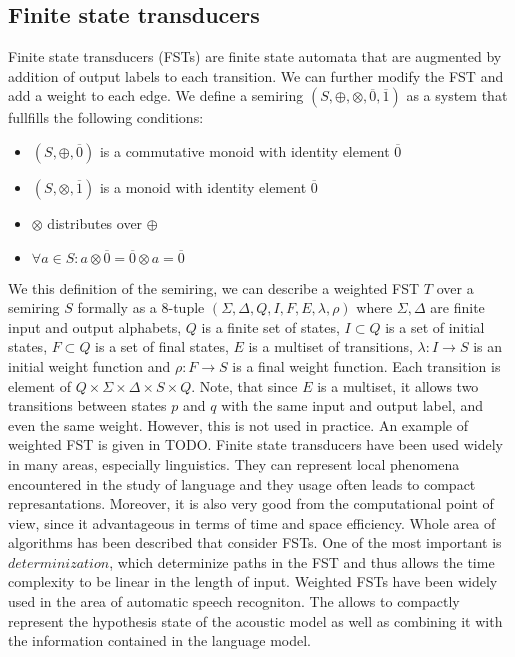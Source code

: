 \subsection{Finite state transducers\cite{mohri1997finite}}
\label{fst-desc}
Finite state transducers (FSTs) are finite state automata that are augmented by addition of output labels to each transition.
We can further modify the FST and add a weight to each edge.
We define a semiring $(S,\oplus,\otimes,\overline{0},\overline{1})$ as a system that fullfills the following conditions:
\begin{itemize}
\item $(S,\oplus,\overline{0})$ is a commutative monoid with identity element $\overline{0}$
\item $(S,\otimes,\overline{1})$ is a monoid with identity element $\overline{0}$
\item $\otimes $ distributes over $\oplus$
\item $\forall a \in S: a \otimes \overline{0} = \overline{0} \otimes a = \overline{0}$
\end{itemize}
We this definition of the semiring, we can describe a weighted FST\cite{mohri2009weighted} $T$ over a semiring $S$ formally as a 8-tuple $(\Sigma,\Delta,Q,I,F,E,\lambda,\rho)$ where $\Sigma, \Delta$ are finite input and output alphabets, $Q$ is a finite set of states, $I \subset Q$ is a set of initial states, $F \subset Q$ is a set of final states, $E$ is a multiset of transitions, $\lambda: I \rightarrow S$ is an initial weight function and $\rho: F \rightarrow S$ is a final weight function.
Each transition is element of $Q \times \Sigma \times \Delta \times S \times Q$.
Note, that since $E$ is a multiset, it allows two transitions between states $p$ and $q$ with the same input
and output label, and even the same weight.
However, this is not used in practice.
An example of weighted FST is given in TODO.
Finite state transducers have been used widely in many areas, especially linguistics.
They can represent local phenomena encountered in the study of language and they usage often leads to compact represantations.
Moreover, it is also very good from the computational point of view, since it advantageous in terms of time and space efficiency.
Whole area of algorithms has been described that consider FSTs.
One of the most important is $determinization$, which determinize paths in the FST and thus allows the time complexity to be linear in the length of input.
Weighted FSTs have been widely used in the area of automatic speech recogniton.
The allows to compactly represent the hypothesis state of the acoustic model as well as combining it with the information contained in the language model.
